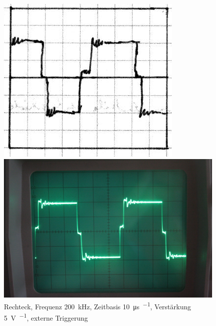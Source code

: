 \begin{figure}[htbp]
	\centering
	\begin{minipage}{.45\linewidth}
	\includegraphics[width=\linewidth]{Skizzen/IMG_0773-1500.jpg}
	\end{minipage}
	\hfill
	\begin{minipage}{.45\linewidth}
	\includegraphics[width=\linewidth]{Fotos/IMG_0773-1500.jpg}
	\end{minipage}
	\caption{%
		Rechteck, Frequenz \SI{200}{\kilo\hertz},
		Zeitbasis \SI{10}{\micro\second\per\division},
		Verstärkung \SI{5}{\volt\per\division},
		externe Triggerung
	}
	\label{fig:0773}
\end{figure}


